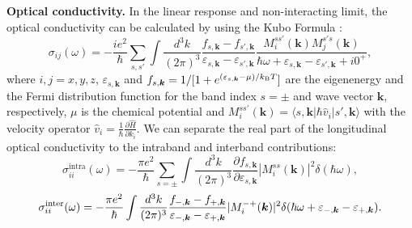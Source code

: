 \documentclass[aps,twocolumn,floatfix]{revtex4-1}
\begin{document}
{\bf Optical conductivity.}
In the linear response and non-interacting limit, the optical conductivity can be calculated by using the Kubo Formula \cite{SM_Mahan}:
\begin{equation}
\label{eq:conductivity}
\sigma_{ij}(\omega)
=- \frac{ie^2}{\hbar} \sum_{s,s'} \int \frac{d^3 k}{(2\pi)^3} \frac{f_{s, \bm{k}}-f_{s',\bm{k}}}{\varepsilon_{s,\bm{k}}-\varepsilon_{s',\bm{k}}}
\frac{M^{ss'}_i(\bm k)M^{s's}_j(\bm k)}{\hbar\omega+\varepsilon_{s,\bm{k}}-\varepsilon_{s',\bm{k}}+i0^+},
\end{equation}
where $i,j=x,y,z$, $\varepsilon_{s,\bm{k}}$ and $f_{s,\bm{k}}=1/[1+e^{(\varepsilon_{s,\bm{k}}-\mu)/k_{\rm B}T}]$ are the eigenenergy and the Fermi distribution function for the band index $s=\pm$ and wave vector $\bm{k}$, respectively, $\mu$ is the chemical potential and $M^{ss'}_i(\bm k)=\langle{s,\bm{k}}|\hbar\hat{v}_i |{s',\bm{k}}\rangle$ with the velocity operator $\hat{v}_i=\frac{1}{\hbar}\frac{\partial \hat{H}}{\partial  k_i}$.
We can separate the real part of the longitudinal optical conductivity to the intraband and interband contributions:
\begin{equation}\label{eq:longitudinal_intra_before_transform}
\sigma^{\mathrm{intra}}_{ii}(\omega)=- \frac{\pi e^2}{\hbar} \sum_{s=\pm} \int \frac{d^3 k}{(2\pi)^3}\frac{\partial f_{s,\bm{k}}}{\partial \varepsilon_{s,\bm{k}}} |M^{ss}_i(\bm k)|^2\delta(\hbar\omega),
\end{equation}
\begin{equation}\label{eq:longitudinal_inter_before_transform}
\sigma^{\rm inter}_{ii}(\omega)
=-\frac{\pi e^2}{\hbar} \int \frac{d^3 k}{(2\pi)^3}
\frac{f_{-,\bm{k}}-f_{+,\bm{k}}}{\varepsilon_{-,\bm{k}}-\varepsilon_{+,\bm{k}}} |M^{-+}_i(\bm k)|^2
\delta(\hbar\omega+\varepsilon_{-,\bm{k}}-\varepsilon_{+,\bm{k}}).
\end{equation}
\end{document}

